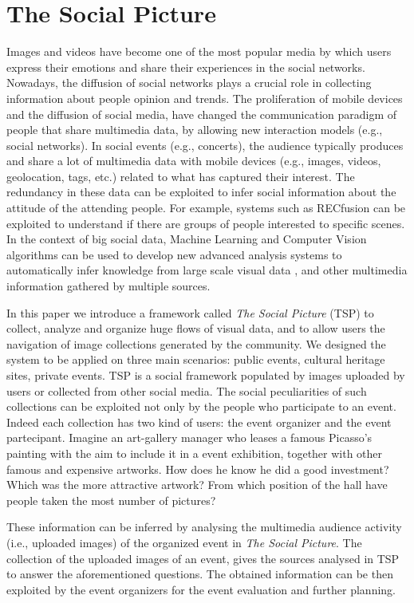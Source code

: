 \section{The Social Picture}
Images and videos have become one of the most popular media by which users express their emotions and share their experiences in the social networks. Nowadays, the diffusion of social networks plays a crucial role in collecting information about people opinion and trends.
The proliferation of mobile devices and the diffusion of social media, have changed the communication paradigm of people that share multimedia data, by allowing new interaction models (e.g., social networks). In social events (e.g., concerts), the audience typically produces and share a lot of multimedia data with mobile devices (e.g., images, videos, geolocation, tags, etc.) related to what has captured their interest. The redundancy in these data can be exploited to infer social information about the attitude of the attending people. For example, systems such as RECfusion \cite{Ortis2015n525} can be exploited to understand if there are groups of people interested to specific scenes. In the context of big social data, Machine Learning and Computer Vision algorithms can be used to develop new advanced analysis systems to automatically infer knowledge from large scale visual data \cite{weyand2015visual}, and other multimedia information gathered by multiple sources.

In this paper we introduce a framework called \textit{The Social Picture} (TSP) to collect, analyze and organize huge flows of visual data, and to allow users the navigation of image collections generated by the community.
We designed the system to be applied on three main scenarios: public events, cultural heritage sites, private events. TSP is a social framework populated by images uploaded by users or collected from other social media. The social peculiarities of such collections can be exploited not only by the people who participate to an event. Indeed each collection has two kind of users: the event organizer and the event partecipant.
Imagine an art-gallery manager who leases a famous Picasso's painting with the aim to include it in a event exhibition, together with other famous and expensive artworks. How does he know he did a good investment? Which was the more attractive artwork? From which position of the hall have people taken the most number of pictures?

These information can be inferred by analysing the multimedia audience activity (i.e., uploaded images) of the organized event in \textit{The Social Picture}. The collection of the uploaded images of an event, gives the sources analysed in TSP to answer the aforementioned questions. The obtained information can be then exploited by the event organizers for the event evaluation and further planning.

